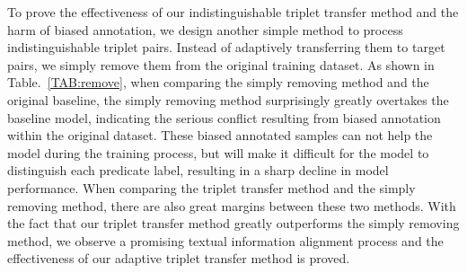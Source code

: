 \documentclass[letterpaper]{article} %
\begin{document}
 To prove the effectiveness of our indistinguishable triplet transfer method and the harm of biased annotation, we design another simple method to process indistinguishable triplet pairs. Instead of adaptively transferring them to target pairs, we simply remove them from the original training dataset.
As shown in Table.~\ref{TAB:remove}, when comparing the simply removing method and the original baseline, the simply removing method surprisingly greatly overtakes the baseline model, indicating the serious conflict resulting from biased annotation within the original dataset. These biased annotated samples can not help the model during the training process, but will make it difficult for the model to distinguish each predicate label, resulting in a sharp decline in model performance. When comparing the triplet transfer method and the simply removing method, there are also great margins between these two methods. With the fact that our triplet transfer method greatly outperforms the simply removing method, we observe a promising textual information alignment process and the effectiveness of our adaptive triplet transfer method is proved.



\end{document}

